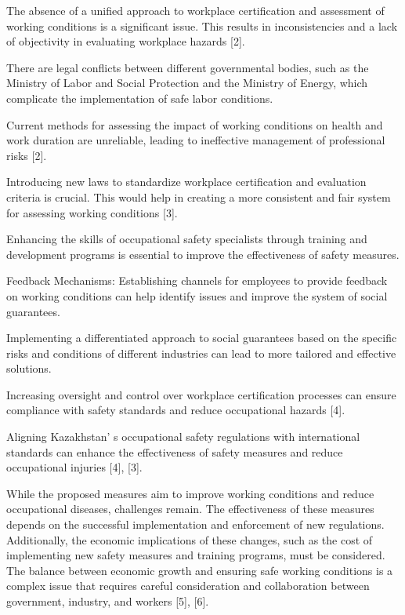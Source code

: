 \begin{multicols}{2}
The absence of a unified approach to workplace certification and
assessment of working conditions is a significant issue. This results in
inconsistencies and a lack of objectivity in evaluating workplace
hazards {[}2{]}.

There are legal conflicts between different governmental bodies, such as
the Ministry of Labor and Social Protection and the Ministry of Energy,
which complicate the implementation of safe labor conditions.

Current methods for assessing the impact of working conditions on health
and work duration are unreliable, leading to ineffective management of
professional risks {[}2{]}.

Introducing new laws to standardize workplace certification and
evaluation criteria is crucial. This would help in creating a more
consistent and fair system for assessing working conditions {[}3{]}.

Enhancing the skills of occupational safety specialists through training
and development programs is essential to improve the effectiveness of
safety measures.

Feedback Mechanisms: Establishing channels for employees to provide
feedback on working conditions can help identify issues and improve the
system of social guarantees.

Implementing a differentiated approach to social guarantees based on the
specific risks and conditions of different industries can lead to more
tailored and effective solutions.

Increasing oversight and control over workplace certification processes
can ensure compliance with safety standards and reduce occupational
hazards {[}4{]}.

Aligning Kazakhstan' s occupational safety regulations
with international standards can enhance the effectiveness of safety
measures and reduce occupational injuries {[}4{]}, {[}3{]}.

While the proposed measures aim to improve working conditions and reduce
occupational diseases, challenges remain. The effectiveness of these
measures depends on the successful implementation and enforcement of new
regulations. Additionally, the economic implications of these changes,
such as the cost of implementing new safety measures and training
programs, must be considered. The balance between economic growth and
ensuring safe working conditions is a complex issue that requires
careful consideration and collaboration between government, industry,
and workers {[}5{]}, {[}6{]}.


\end{multicols}
